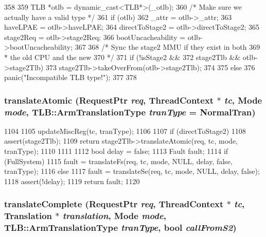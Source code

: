 \begin{DoxyCode}
358 {
359     TLB *otlb = dynamic_cast<TLB*>(_otlb);
360     /* Make sure we actually have a valid type */
361     if (otlb) {
362         _attr = otlb->_attr;
363         haveLPAE = otlb->haveLPAE;
364         directToStage2 = otlb->directToStage2;
365         stage2Req = otlb->stage2Req;
366         bootUncacheability = otlb->bootUncacheability;
367 
368         /* Sync the stage2 MMU if they exist in both
369          * the old CPU and the new
370          */
371         if (!isStage2 &&
372             stage2Tlb && otlb->stage2Tlb) {
373             stage2Tlb->takeOverFrom(otlb->stage2Tlb);
374         }
375     } else {
376         panic("Incompatible TLB type!");
377     }
378 }
\end{DoxyCode}
\hypertarget{classArmISA_1_1TLB_ad9813aa5a0ed9ba84b634d9960006ed2}{
\subsubsection[{translateAtomic}]{ translateAtomic ({\bf RequestPtr} {\em req}, \/  {\bf ThreadContext} $\ast$ {\em tc}, \/  {\bf Mode} {\em mode}, \/  {\bf TLB::ArmTranslationType} {\em tranType} = {\ttfamily NormalTran})}}
\label{classArmISA_1_1TLB_ad9813aa5a0ed9ba84b634d9960006ed2}



\begin{DoxyCode}
1104 {
1105     updateMiscReg(tc, tranType);
1106 
1107     if (directToStage2) {
1108         assert(stage2Tlb);
1109         return stage2Tlb->translateAtomic(req, tc, mode, tranType);
1110     }
1111 
1112     bool delay = false;
1113     Fault fault;
1114     if (FullSystem)
1115         fault = translateFs(req, tc, mode, NULL, delay, false, tranType);
1116     else
1117         fault = translateSe(req, tc, mode, NULL, delay, false);
1118     assert(!delay);
1119     return fault;
1120 }
\end{DoxyCode}
\hypertarget{classArmISA_1_1TLB_adc8f6be2e370d6ce03ae8044ff6f8709}{
\subsubsection[{translateComplete}]{ translateComplete ({\bf RequestPtr} {\em req}, \/  {\bf ThreadContext} $\ast$ {\em tc}, \/  {\bf Translation} $\ast$ {\em translation}, \/  {\bf Mode} {\em mode}, \/  {\bf TLB::ArmTranslationType} {\em tranType}, \/  bool {\em callFromS2})}}
\label{classArmISA_1_1TLB_adc8f6be2e370d6ce03ae8044ff6f8709}



